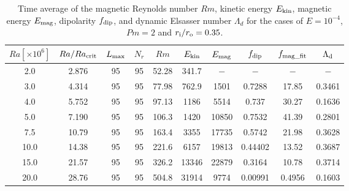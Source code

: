 \begin{table*}
\caption{Time average of the magnetic Reynolds number $Rm$, kinetic energy $E_{\rm kin}$, magnetic energy $E_{\rm mag}$, dipolarity $f_{\rm dip}$, and dynamic Elsasser number $\Lambda_{d}$ for the cases of $E = 10^{-4}$, $Pm = 2$ and $r_{\rm i}/r_{\rm o} = 0.35$.}
  \begin{tabular}{cccccccccc}
    \hline
     $Ra[\times 10^6]$  &  $Ra/Ra_{\rm crit}$& 
     $L_{\rm max}$ & $N_{r}$ & $Rm$ 
     & $E_{\rm kin}$  &  $E_{\rm mag}$ & $f_{\rm dip}$ & $f_{\rm mag\_fit}$ & $\Lambda_{\rm d}$\\
    \hline
      2.0 & 2.876 & 95 & 95 & 52.28 & 341.7 & $-$ & $-$ & $-$ & $-$  \\
      3.0 & 4.314 & 95 & 95 & 77.98 & 762.9 & 1501 & 0.7288 & 17.85 & 0.3461 \\
      4.0 & 5.752 & 95 & 95 & 97.13 & 1186 & 5514 & 0.737 & 30.27 & 0.1636 \\
      5.0 & 7.190 & 95 & 95 & 106.3 & 1420 & 10850 & 0.7532 & 41.39 & 0.2801 \\
      7.5 & 10.79 & 95 & 95 & 163.4 & 3355 & 17735 & 0.5742 & 21.98 &  0.3628 \\
      10.0 & 14.38 & 95 & 95 & 221.6 & 6157 & 19813 & 0.44402 & 13.52 &  0.3687 \\
      15.0 & 21.57 & 95 & 95 & 326.2 & 13346 & 22879 & 0.3164 & 10.78 &  0.3714  \\
      20.0 & 28.76 & 95 & 95 & 504.8 & 31914 & 9774 & 0.00991 & 0.4956 & 0.1603 \\
    \hline
  \end{tabular}
\label{table:SummaryEk4_35}
\end{table*}